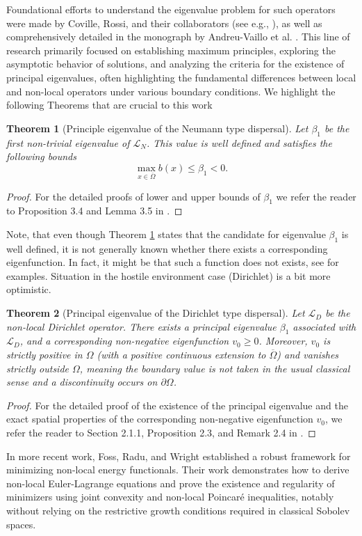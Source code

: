 \documentclass[11pt, a4paper]{article}
\theoremstyle{break}
\newtheorem{thm}{Theorem}[section]
\theoremstyle{break}
\theoremstyle{break}
\theoremstyle{break}
\theoremstyle{break}
\theoremstyle{break}
\theoremstyle{break}
\theoremstyle{break}
\theoremstyle{break}
\begin{document}
Foundational efforts to understand the eigenvalue problem for such operators were made by Coville, Rossi, and their collaborators (see e.g., \cite{ChasseigneChavesRossi2006, Coville2010, GarciaMelianRossi2009}), as well as comprehensively detailed in the monograph by Andreu-Vaillo et al. \cite{AndreuVaillo2010}. This line of research primarily focused on establishing maximum principles, exploring the asymptotic behavior of solutions, and analyzing the criteria for the existence of principal eigenvalues, often highlighting the fundamental differences between local and non-local operators under various boundary conditions. We highlight the following Theorems that are crucial to this work
\begin{thm}[Principle eigenvalue of the Neumann type dispersal]
    \label{thm:beta1_bounds}
    Let $\beta_1$ be the first non-trivial eigenvalue of $\mathcal{L}_N$. This value is well defined and satisfies the following bounds
    \begin{equation}
        \max_{x\in\overline{\Omega}} b(x) \leq \beta_1 < 0.
    \end{equation}
\end{thm}
\begin{proof}
    For the detailed proofs of lower and upper bounds of $\beta_1$ we refer the reader to Proposition 3.4 and Lemma 3.5 in \cite{AndreuVaillo2010}.
\end{proof}
Note, that even though Theorem \ref{thm:beta1_bounds} states that the candidate for eigenvalue $\beta_1$ is well defined, it is not generally known whether there exists a corresponding eigenfunction. In fact, it might be that such a function does not exists, see \cite{Coville2010, ShenZhang2010} for examples. Situation in the hostile environment case (Dirichlet) is a bit more optimistic.
\begin{thm}[Principal eigenvalue of the Dirichlet type dispersal]
    \label{thm:dirichlet_principal_eigenvalue}
    Let $\mathcal{L}_D$ be the non-local Dirichlet operator. There exists a principal eigenvalue $\beta_1$ associated with $\mathcal{L}_D$, and a corresponding non-negative eigenfunction $v_0 \ge 0$. Moreover, $v_0$ is strictly positive in $\Omega$ (with a positive continuous extension to $\overline{\Omega}$) and vanishes strictly outside $\Omega$, meaning the boundary value is not taken in the usual classical sense and a discontinuity occurs on $\partial\Omega$.
\end{thm}
\begin{proof}
    For the detailed proof of the existence of the principal eigenvalue and the exact spatial properties of the corresponding non-negative eigenfunction $v_0$, we refer the reader to Section 2.1.1, Proposition 2.3, and Remark 2.4 in \cite{AndreuVaillo2010}.
\end{proof}
In more recent work, Foss, Radu, and Wright \cite{FossRaduWright2018} established a robust framework for minimizing non-local energy functionals. Their work demonstrates how to derive non-local Euler-Lagrange equations and prove the existence and regularity of minimizers using joint convexity and non-local Poincar\'e inequalities, notably without relying on the restrictive growth conditions required in classical Sobolev spaces.
\end{document}
